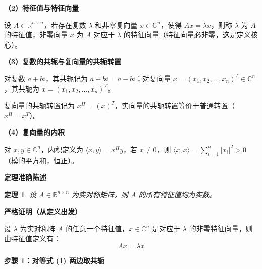\documentclass[10pt]{article}
\numberwithin{equation}{section}
\theoremstyle{plain}
\newtheorem{theorem}{定理}[section]
\theoremstyle{definition}
\theoremstyle{remark}
\newcommand{\R}{\mathbb{R}}
\begin{document}
{\par\vspace{0.8ex}\noindent\normalsize\bfseries\color{secblue} （2）特征值与特征向量\par}

设 $A\in\R^{n\times n}$，若存在复数 $\lambda$ 和非零复向量 $x\in\mathbb{C}^n$，使得 $Ax=\lambda x$，则称 $\lambda$ 为 $A$ 的特征值，非零向量 $x$ 为 $A$ 对应于 $\lambda$ 的特征向量（特征向量必非零，这是定义核心）。

{\par\vspace{0.8ex}\noindent\normalsize\bfseries\color{secblue} （3）复数的共轭与复向量的共轭转置\par}

对复数 $a+bi$，其共轭记为 $\overline{a+bi}=a-bi$；对复向量 $x=(x_1,x_2,\ldots,x_n)^T\in\mathbb{C}^n$，其共轭为 $\overline{x}=(\overline{x_1},\overline{x_2},\ldots,\overline{x_n})^T$。

复向量的共轭转置记为 $x^H=(\overline{x})^T$，实向量的共轭转置等价于普通转置（$x^H=x^T$）。

{\par\vspace{0.8ex}\noindent\normalsize\bfseries\color{secblue} （4）复向量的内积\par}

对 $x,y\in\mathbb{C}^n$，内积定义为 $\langle x,y\rangle=x^H y$，若 $x\neq 0$，则 $\langle x,x\rangle=\sum_{i=1}^n |x_i|^2 > 0$（模的平方和，恒正）。

{\par\vspace{0.8ex}\noindent\normalsize\bfseries\color{secblue} 定理准确陈述\par}

\begin{theorem}
	设 $A\in\R^{n\times n}$ 为实对称矩阵，则 $A$ 的所有特征值均为实数。
\end{theorem}

{\par\vspace{0.8ex}\noindent\normalsize\bfseries\color{secblue} 严格证明（从定义出发）\par}

设 $\lambda$ 为实对称阵 $A$ 的任意一个特征值，$x\in\mathbb{C}^n$ 是对应于 $\lambda$ 的非零特征向量，则由特征值定义有：
\begin{equation}
	Ax=\lambda x
\end{equation}

{\par\vspace{0.8ex}\noindent\normalsize\bfseries\color{secblue} 步骤 1：对等式 (1) 两边取共轭\par}
\end{document}
